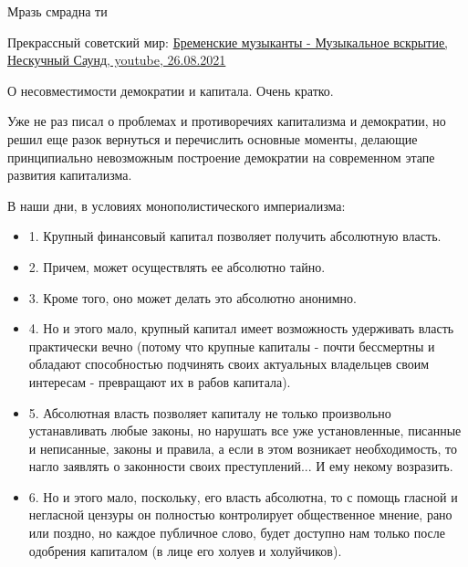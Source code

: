 \begin{itemize}
\begin{itemize}
Мразь смрадна ти
\end{itemize}

 
Прекрассный советский мир:
\href{https://youtu.be/-lpwR8pTsL4}{%
Бременские музыканты - Музыкальное вскрытие, Нескучный Саунд, %
youtube, 26.08.2021%
}

 

О несовместимости демократии и капитала. Очень кратко.

Уже не раз писал о проблемах и противоречиях капитализма и демократии, но решил
еще разок вернуться и перечислить основные моменты, делающие принципиально
невозможным построение демократии на современном этапе развития капитализма.

В наши дни, в условиях монополистического империализма:

\begin{itemize}
\item 1. Крупный финансовый капитал позволяет получить абсолютную власть.

\item 2. Причем, может осуществлять ее абсолютно тайно.

\item 3. Кроме того, оно может делать это абсолютно анонимно.

\item 4. Но и этого мало, крупный капитал имеет возможность удерживать власть
практически вечно (потому что крупные капиталы - почти бессмертны и обладают
способностью подчинять своих актуальных владельцев своим интересам - превращают
их в рабов капитала).

\item 5. Абсолютная власть позволяет капиталу не только произвольно устанавливать
любые законы, но нарушать все уже установленные, писанные и неписанные, законы
и правила, а если в этом возникает необходимость, то нагло заявлять о
законности своих преступлений... И ему некому возразить.

\item 6. Но и этого мало, поскольку, его власть абсолютна, то с помощь гласной и
негласной цензуры он полностью контролирует общественное мнение, рано или
поздно, но каждое публичное слово, будет доступно нам только после одобрения
капиталом (в лице его холуев и холуйчиков).
\end{itemize}


\end{itemize}
